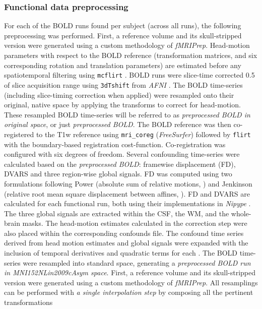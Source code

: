 \documentclass[fleqn,10pt]{wlscirep}
\begin{document}
\subsubsection*{Functional data preprocessing}
For each of the BOLD runs found per subject (across all runs), the following preprocessing was performed. First, a reference
volume and its skull-stripped version were generated using a custom
methodology of \emph{fMRIPrep}. Head-motion parameters with respect to
the BOLD reference (transformation matrices, and six corresponding
rotation and translation parameters) are estimated before any
spatiotemporal filtering using \texttt{mcflirt} \citep[\emph{FSL}
,][]{mcflirt}. BOLD runs were slice-time corrected 0.5 of
slice acquisition range using \texttt{3dTshift} from \emph{AFNI}
\citep[RRID:SCR\_005927]{afni}. The BOLD time-series (including
slice-timing correction when applied) were resampled onto their
original, native space by applying the transforms to correct for
head-motion. These resampled BOLD time-series will be referred to as
\emph{preprocessed BOLD in original space}, or just \emph{preprocessed
BOLD}. The BOLD reference was then co-registered to the T1w reference
using \texttt{mri\_coreg} (\emph{FreeSurfer}) followed by \texttt{flirt}
\citep[\emph{FSL} ,][]{flirt} with the boundary-based registration \citep{bbr}
cost-function. Co-registration was configured with six degrees of
freedom. Several confounding time-series were calculated based on the
\emph{preprocessed BOLD}: framewise displacement (FD), DVARS and three
region-wise global signals. FD was computed using two formulations
following Power (absolute sum of relative motions,
\citet{power_fd_dvars}) and Jenkinson (relative root mean square
displacement between affines, \citet{mcflirt}). FD and DVARS are
calculated for each functional run, both using their implementations in
\emph{Nipype} \citep[following the definitions by][]{power_fd_dvars}.
The three global signals are extracted within the CSF, the WM, and the
whole-brain masks. The head-motion estimates calculated in the correction step were also placed
within the corresponding confounds file. The confound time series
derived from head motion estimates and global signals were expanded with
the inclusion of temporal derivatives and quadratic terms for each
\citep{satterthwaite_2013}. The BOLD time-series were resampled into
standard space, generating a \emph{preprocessed BOLD run in
MNI152NLin2009cAsym space}. First, a reference volume and its
skull-stripped version were generated using a custom methodology of
\emph{fMRIPrep}. All resamplings can be performed with \emph{a single
interpolation step} by composing all the pertinent transformations
\end{document}
